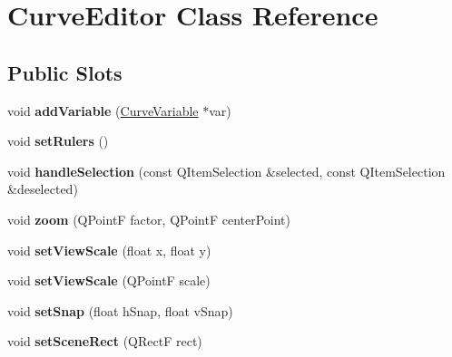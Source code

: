 \hypertarget{class_curve_editor}{
\section{\-Curve\-Editor \-Class \-Reference}
\label{class_curve_editor}
}
\subsection*{\-Public \-Slots}
\begin{DoxyCompactItemize}
\item 
\hypertarget{class_curve_editor_a68eed109fed9e21fbef0711a75e19728}{
void {\bfseries add\-Variable} (\hyperlink{class_curve_variable}{\-Curve\-Variable} $\ast$var)}
\label{class_curve_editor_a68eed109fed9e21fbef0711a75e19728}

\item 
\hypertarget{class_curve_editor_a7426ab13dfa9b2b89ca0cec1026e0764}{
void {\bfseries set\-Rulers} ()}
\label{class_curve_editor_a7426ab13dfa9b2b89ca0cec1026e0764}

\item 
\hypertarget{class_curve_editor_a77c5428bda00c0cbfb8901925bd79dd4}{
void {\bfseries handle\-Selection} (const \-Q\-Item\-Selection \&selected, const \-Q\-Item\-Selection \&deselected)}
\label{class_curve_editor_a77c5428bda00c0cbfb8901925bd79dd4}

\item 
\hypertarget{class_curve_editor_aae747326ca267abbf6f149f47bff3f53}{
void {\bfseries zoom} (\-Q\-Point\-F factor, \-Q\-Point\-F center\-Point)}
\label{class_curve_editor_aae747326ca267abbf6f149f47bff3f53}

\item 
\hypertarget{class_curve_editor_a9fc1b141818a3b8d8e75cd3f5eaebd7a}{
void {\bfseries set\-View\-Scale} (float x, float y)}
\label{class_curve_editor_a9fc1b141818a3b8d8e75cd3f5eaebd7a}

\item 
\hypertarget{class_curve_editor_af2b29495c93b46414e72830fcc88feae}{
void {\bfseries set\-View\-Scale} (\-Q\-Point\-F scale)}
\label{class_curve_editor_af2b29495c93b46414e72830fcc88feae}

\item 
\hypertarget{class_curve_editor_a8505414b15773db973ba4ba514994622}{
void {\bfseries set\-Snap} (float h\-Snap, float v\-Snap)}
\label{class_curve_editor_a8505414b15773db973ba4ba514994622}

\item 
\hypertarget{class_curve_editor_afd153e8fd4800ee3ce087de9d08f4942}{
void {\bfseries set\-Scene\-Rect} (\-Q\-Rect\-F rect)}
\label{class_curve_editor_afd153e8fd4800ee3ce087de9d08f4942}


\end{DoxyCompactItemize}
